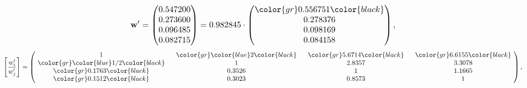\begin{example}
\begin{equation*}
\mathbf{w}^{\prime} =
\begin{pmatrix}
0.547200\\
0.273600\\
0.096485\\
0.082715
\end{pmatrix} =
0.982845\cdot
\begin{pmatrix}
\color{gr} 0.556751\color{black} \\
0.278376\\
0.098169\\
0.084158
\end{pmatrix},
\end{equation*}
\begin{equation*}
\left[ \frac{{w}^{\prime}_i}{{w}^{\prime}_j} \right] =
\begin{pmatrix}
$\,\,$ 1 $\,\,$ & $\,\,$\color{gr} \color{blue} 2\color{black} $\,\,$ & $\,\,$\color{gr} 5.6714\color{black} $\,\,$ & $\,\,$\color{gr} 6.6155\color{black} $\,\,$ \\
$\,\,$\color{gr} \color{blue}  1/2\color{black} $\,\,$ & $\,\,$ 1 $\,\,$ & $\,\,$2.8357$\,\,$ & $\,\,$3.3078  $\,\,$ \\
$\,\,$\color{gr} 0.1763\color{black} $\,\,$ & $\,\,$0.3526$\,\,$ & $\,\,$ 1 $\,\,$ & $\,\,$1.1665 $\,\,$ \\
$\,\,$\color{gr} 0.1512\color{black} $\,\,$ & $\,\,$0.3023$\,\,$ & $\,\,$0.8573$\,\,$ & $\,\,$ 1  $\,\,$ \\
\end{pmatrix},
\end{equation*}
\end{example}
\newpage
